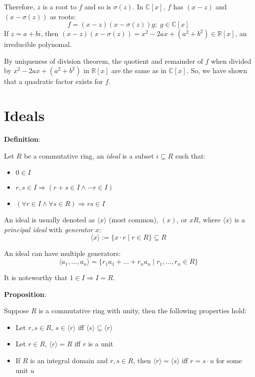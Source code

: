 \documentclass{article}
\begin{document}
\begin{multicols*}{2}
Therefore, $z$ is a root to $f$ and so is $\sigma(z)$. In $\mathbb{C}[x]$, $f$ has $(x - z)$ and $(x-\sigma(z))$ as roots: \[f = (x-z)(x-\sigma(z))g;\;g\in \mathbb{C}[x]\] If $z = a+bi$, then $(x-z)(x-\sigma(z)) = x^2 -2ax + (a^2+b^2) \in \mathbb{R}[x]$, an irreducible polynomal.

By uniqueness of division theorem, the quotient and remainder of $f$ when divided by $x^2 -2ax + (a^2+b^2)$ in $\mathbb{R}[x]$ are the same as in $\mathbb{C}[x]$. So, we have shown that a quadratic factor exists for $f$.

\section{Ideals}

\textbf{Definition}:

Let $R$ be a commutative ring, an \textit{ideal} is a subset $i \subseteq R$ such that:

\begin{itemize}
    \item $0 \in I$
    \item $r, s \in I \Rightarrow (r+s \in I \wedge -r \in I)$
    \item $(\forall r \in I \wedge \forall s \in R) \Rightarrow rs \in I$
\end{itemize}

An ideal is usually denoted as $\langle x \rangle$ (most common), $(x)$, or $xR$, where $\langle x \rangle$ is a \textit{principal ideal} with \textit{generator} $x$:\[\langle x \rangle := \{x \cdot r \;|\; r \in R\} \subseteq R\]

An ideal can have multiple generators:\[\langle a_1, \dots, a_n \rangle =\{ r_1a_1 + \dots + r_na_n \;|\; r_1,\dots,r_n \in R\}\]

It is noteworthy that $1 \in I \Rightarrow I = R$.

\textbf{Proposition}:

Suppose $R$ is a commutative ring with unity, then the following properties hold:

\begin{itemize}
    \item Let $r, s \in R$,  $s \in \langle r \rangle$ iff $\langle s \rangle \subseteq \langle r \rangle$
    \item Let $r \in R$, $\langle r \rangle = R$ iff $r$ is a unit
    \item If $R$ is an integral domain and $r, s \in R$, then $\langle r \rangle = \langle s \rangle$ iff $r = s \cdot u$ for some unit $u$
\end{itemize}


\end{multicols*}
\end{document}

